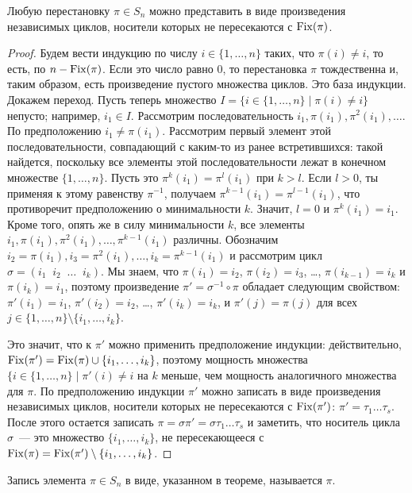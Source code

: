 \begin{theorem}
Любую перестановку $\pi\in S_n$ можно представить в виде произведения
независимых циклов, носители которых не пересекаются с $\operatorname{Fix}(\pi)$.
\end{theorem}
\begin{proof}
Будем вести индукцию по числу $i\in\{1,\dots,n\}$ таких, что
$\pi(i)\neq i$, то есть, по $n-\operatorname{Fix}(\pi)$.
Если это число равно $0$, то перестановка $\pi$
тождественна и, таким образом, есть произведение пустого множества
циклов. Это база индукции. Докажем переход.
Пусть теперь множество $I = \{i\in\{1,\dots,n\}\mid \pi(i)\neq i\}$
непусто; например, $i_1\in I$. Рассмотрим последовательность
$i_1,\pi(i_1),\pi^2(i_1),\dots$. По предположению
$i_1\neq\pi(i_1)$. Рассмотрим первый элемент этой последовательности,
совпадающий с каким-то из ранее встретившихся: такой найдется,
поскольку все элементы этой последовательности лежат в конечном
множестве $\{1,\dots,n\}$. Пусть это $\pi^k(i_1) =
\pi^l(i_1)$ при $k>l$. Если $l>0$, ты применяя к этому равенству
$\pi^{-1}$, получаем $\pi^{k-1}(i_1) = \pi^{l-1}(i_1)$, что
противоречит предположению о минимальности $k$. Значит,
$l=0$ и $\pi^k(i_1) = i_1$. Кроме того, опять же в силу минимальности
$k$, все элементы $i_1,\pi(i_1),\pi^2(i_1),\dots,\pi^{k-1}(i_1)$
различны. Обозначим
$i_2=\pi(i_1),i_3=\pi^2(i_1),\dots,i_k=\pi^{k-1}(i_1)$ и рассмотрим
цикл $\sigma=(i_1\;\;i_2\;\;\dots\;\;i_k)$. Мы знаем, что
$\pi(i_1)=i_2$, $\pi(i_2)=i_3$, \dots, $\pi(i_{k-1})=i_k$ и
$\pi(i_k) = i_1$, поэтому произведение
$\pi' = \sigma^{-1}\circ\pi$ обладает следующим свойством:
$\pi'(i_1) = i_1$, $\pi'(i_2) = i_2$, \dots, $\pi'(i_k) = i_k$,
и $\pi'(j)=\pi(j)$ для всех
$j\in\{1,\dots,n\}\setminus\{i_1,\dots,i_k\}$.

Это значит, что к $\pi'$ можно применить предположение индукции:
действительно, $\operatorname{Fix}(\pi') = \operatorname{Fix}(\pi)\cup\{i_1,\dots,i_k\}$, поэтому
мощность множества $\{i\in\{1,\dots,n\}\mid \pi'(i)\neq i$ на $k$
меньше, чем мощность аналогичного множества для $\pi$.
По предположению индукции $\pi'$ можно записать в виде произведения
независимых циклов, носители которых не пересекаются с $\operatorname{Fix}(\pi')$:
$\pi' = \tau_1\dots\tau_s$. После этого остается записать
$\pi = \sigma\pi' = \sigma\tau_1\dots\tau_s$ и заметить, что носитель
цикла $\sigma$~--- это множество $\{i_1,\dots,i_k\}$, не
пересекающееся с $\operatorname{Fix}(\pi) = \operatorname{Fix}(\pi')\setminus\{i_1,\dots,i_k\}$.
\end{proof}

\begin{definition}
Запись элемента $\pi\in S_n$ в виде, указанном в теореме,
называется  $\pi$.
\end{definition}

